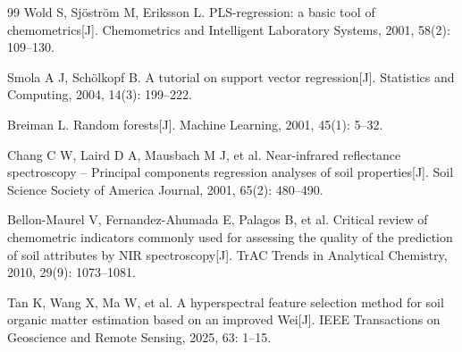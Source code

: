 \documentclass[12pt,a4paper]{article}
\begin{document}
\begin{thebibliography}{99}
Wold S, Sjöström M, Eriksson L.
PLS-regression: a basic tool of chemometrics[J].
Chemometrics and Intelligent Laboratory Systems, 2001, 58(2): 109--130.

Smola A J, Schölkopf B.
A tutorial on support vector regression[J].
Statistics and Computing, 2004, 14(3): 199--222.

Breiman L.
Random forests[J].
Machine Learning, 2001, 45(1): 5--32.

Chang C W, Laird D A, Mausbach M J, et al.
Near-infrared reflectance spectroscopy -- Principal components regression analyses of soil properties[J].
Soil Science Society of America Journal, 2001, 65(2): 480--490.

Bellon-Maurel V, Fernandez-Ahumada E, Palagos B, et al.
Critical review of chemometric indicators commonly used for assessing the quality of the prediction of soil attributes by NIR spectroscopy[J].
TrAC Trends in Analytical Chemistry, 2010, 29(9): 1073--1081.

Tan K, Wang X, Ma W, et al.
A hyperspectral feature selection method for soil organic matter estimation based on an improved Wei[J].
IEEE Transactions on Geoscience and Remote Sensing, 2025, 63: 1--15.

\end{thebibliography}
\end{document}
